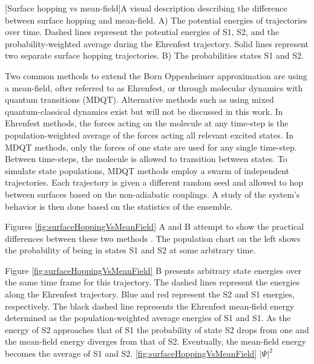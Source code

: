 \noindent
	      \begin{multiFigure} 
		[Surface hopping vs mean-field]{A visual description describing the difference between surface hopping and mean-field. A) The potential energies of trajectories over time. Dashed lines represent the potential energies of S1, S2, and the probability-weighted average during the Ehrenfest trajectory. Solid lines represent two separate surface hopping trajectories. B) The probabilities states S1 and S2.}
		\label{fig:surfaceHoppingVsMeanField}
	      \end{multiFigure}
       \bigskip


Two common methods to extend the Born Oppenheimer approximation are using a mean-field, ofter referred to as Ehrenfest, or through molecular dynamics with quantum transitions (MDQT).\cite{Hammes-Schiffer1994} Alternative methods such as using mixed quantum-classical dynamics exist but will not be discussed in this work. \cite{habershon2013ring,kapral2006progress} In Ehrenfest methods, the forces acting on the molecule at any time-step is the population-weighted average of the forces acting  all relevant excited states. In MDQT methods, only the forces of one state are used for any single time-step. \cite{prezhdo1997evaluation}
Between time-steps, the molecule is allowed to transition between states.
To simulate state populations, MDQT methods employ a swarm of independent trajectories. Each trajectory is given a different random seed and allowed to hop between surfaces based on the non-adiabatic couplings. A study of the system's behavior is then done based on the statistics of the ensemble.

Figures \ref{fig:surfaceHoppingVsMeanField} A and B attempt to show the practical differences between these two methods .
The population chart on the left shows the probability of being in states S1 and S2 at some arbitrary time.

Figure \ref{fig:surfaceHoppingVsMeanField} B presents arbitrary state energies over the same time frame for this trajectory.
The dashed lines represent the energies along the Ehrenfest trajectory.
Blue and red represent the S2 and S1 energies, respectively.
The black dashed line represents the Ehrenfest mean-field energy determined as the population-weighted average energies of S1 and S1.
As the energy of S2 approaches that of S1 the probability of state S2 drops from one and the mean-field energy diverges from that of S2.
Eventually, the mean-field energy becomes the average of S1 and S2.  \ref{fig:surfaceHoppingVsMeanField}  \(|\Psi|^2\) 

